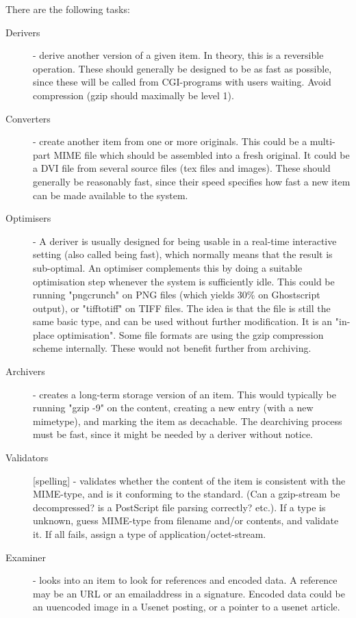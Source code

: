 There are the following tasks:
\begin{description}
  
\item[Derivers] - derive another version of a given item.  In theory,
  this is a reversible operation.  These should generally be designed
  to be as fast as possible, since these will be called from
  CGI-programs with users waiting.  Avoid compression (gzip should
  maximally be level 1).

\item[Converters] - create another item from one or more originals.
  This could be a multi-part MIME file which should be assembled into
  a fresh original.  It could be a DVI file from several source files
  (tex files and images).  These should generally be reasonably fast,
  since their speed specifies how fast a new item can be made
  available to the system.

\item[Optimisers] - A deriver is usually designed for being usable in
  a real-time interactive setting (also called being fast), which
  normally means that the result is sub-optimal.  An optimiser
  complements this by doing a suitable optimisation step whenever the
  system is sufficiently idle.  This could be running "pngcrunch" on
  PNG files (which yields 30\% on Ghostscript output), or "tifftotiff"
  on TIFF files.  The idea is that the file is still the same basic
  type, and can be used without further modification.  It is an
  "in-place optimisation".  Some file formats are using the gzip
  compression scheme internally.  These would not benefit further from
  archiving.
  
\item[Archivers] - creates a long-term storage version of an item.
  This would typically be running "gzip -9" on the content, creating a
  new entry (with a new mimetype), and marking the item as decachable.
  The dearchiving process must be fast, since it might be needed by a
  deriver without notice.
  
\item[Validators] [spelling] - validates whether the content of the
  item is consistent with the MIME-type, and is it conforming to the
  standard.  (Can a gzip-stream be decompressed? is a PostScript file
  parsing correctly? etc.).  If a type is unknown, guess MIME-type
  from filename and/or contents, and validate it.  If all fails,
  assign a type of application/octet-stream.

\item[Examiner] - looks into an item to look for references and
  encoded data.  A reference may be an URL or an emailaddress in a
  signature.  Encoded data could be an uuencoded image in a Usenet
  posting, or a pointer to a usenet article.
\end{description}

